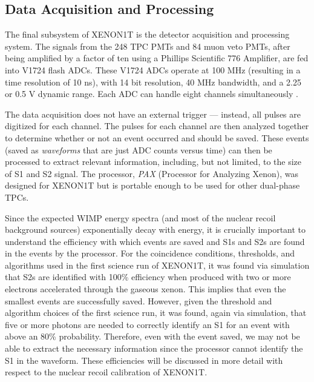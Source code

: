 \subsection{Data Acquisition and Processing}
\label{sec:xe1t_daq_pax}

The final subsystem of XENON1T is the detector acquisition and processing system.  The signals from the 248 TPC PMTs and 84 muon veto PMTs, after being amplified by a factor of ten using a Phillips Scientific 776 Amplifier, are fed into V1724 flash ADCs.  These V1724 ADCs operate at 100 MHz (resulting in a time resolution of 10 ns), with 14 bit resolution, 40 MHz bandwidth, and a 2.25 or 0.5 V dynamic range.   Each ADC can handle eight channels simultaneously \cite{caen2017v1724}.  

The data acquisition does not have an external trigger --- instead, all pulses are digitized for each channel.  The pulses for each channel are then analyzed together to determine whether or not an event occurred and should be saved.  These events (saved as \textit{waveforms} that are just ADC counts versus time) can then be processed to extract relevant information, including, but not limited, to the size of S1 and S2 signal.  The processor, \textit{PAX} (Processor for Analyzing Xenon), was designed for XENON1T but is portable enough to be used for other dual-phase TPCs. %

Since the expected WIMP energy spectra (and most of the nuclear recoil background sources) exponentially decay with energy, it is crucially important to understand the efficiency with which events are saved and S1s and S2s are found in the events by the processor.  For the coincidence conditions, thresholds, and algorithms used in the first science run of XENON1T, it was found via simulation that S2s are identified with 100\% efficiency when produced with two or more electrons accelerated through the gaseous xenon.  This implies that even the smallest events are successfully saved.  However, given the threshold and algorithm choices of the first science run, it was found, again via simulation, that five or more photons are needed to correctly identify an S1 for an event with above an 80\% probability.  Therefore, even with the event saved, we may not be able to extract the necessary information since the processor cannot identify the S1 in the waveform.  These efficiencies will be discussed in more detail with respect to the nuclear recoil calibration of XENON1T.

